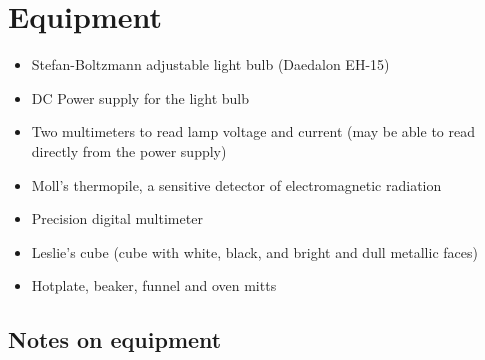 \section{Equipment}

\begin{itemize}



\item Stefan-Boltzmann adjustable light bulb (Daedalon EH-15)

\item DC Power supply for the light bulb

\item Two multimeters to read lamp voltage and current (may be able to read directly from the power supply)

\item Moll's thermopile, a sensitive detector of
electromagnetic radiation

\item Precision digital multimeter


\item Leslie's cube (cube with white, black, and bright and
dull metallic faces)

\item Hotplate, beaker, funnel and oven mitts
\end{itemize}

\subsection{Notes on equipment}


